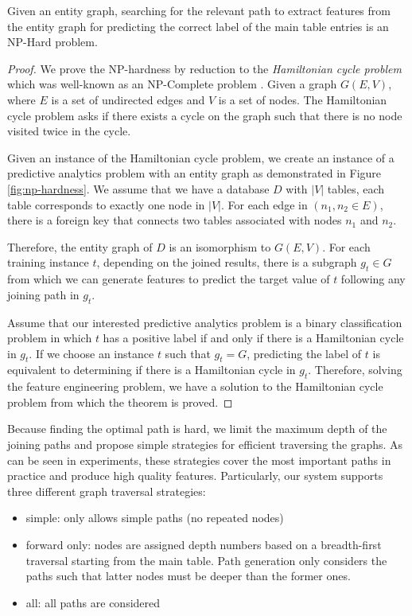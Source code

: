 \begin{theorem}
Given an entity graph, searching for the relevant path to extract features from the entity graph for predicting the correct label of the main table entries is an NP-Hard problem.
\end{theorem} 
\begin{proof}
We prove the NP-hardness by reduction to the \textit{Hamiltonian cycle problem} which was well-known as an NP-Complete problem \cite{karp1972reducibility}. Given a graph $G(E,V)$, where $E$ is a set of undirected edges and $V$ is a set of nodes. The Hamiltonian cycle problem asks if there exists a cycle on the graph such that there is no node visited twice in the cycle.

Given an instance of the Hamiltonian cycle problem, we create an instance of a predictive analytics problem with an entity graph as demonstrated in Figure \ref{fig:np-hardness}. We assume that we have a database $D$ with $|V|$ tables, each table corresponds to exactly one node in $|V|$. For each edge in $ (n_1, n_2 \in E)$, there is a foreign key that connects two tables associated with nodes $n_1$ and $n_2$.

Therefore, the entity graph of $D$ is an isomorphism to  $G(E,V)$. For each training instance $t$, depending on the joined results, there is a subgraph $g_t \in G$ from which we can generate features to predict the target value of $t$ following any joining path in $g_t$.

Assume that our interested predictive analytics problem is a binary classification problem in which $t$ has a positive label if and only if there is a Hamiltonian cycle in $g_t$. If we choose an instance $t$ such that $g_t = G$, predicting the label of $t$ is equivalent to determining if there is a Hamiltonian cycle in $g_t$. Therefore, solving the feature engineering problem, we have a solution to the Hamiltonian cycle problem from which the theorem is proved.
\end{proof}

Because finding the optimal path is hard, we limit the maximum depth of the joining paths and propose simple strategies for efficient traversing the graphs. As can be seen in experiments, these strategies cover the most important paths in practice and produce high quality features. Particularly, our system supports three different graph traversal strategies:
\begin{itemize}
\item simple: only allows simple paths (no repeated nodes)
\item forward only: nodes are assigned depth numbers based on a breadth-first traversal starting from the main table. Path generation only considers the paths such that latter nodes  must be deeper than the former ones.
\item all: all paths are considered
\end{itemize} 

